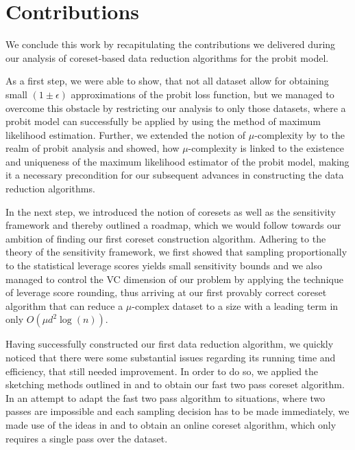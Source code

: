 \section{Contributions}

We conclude this work by recapitulating the contributions we delivered
during our analysis of coreset-based data reduction algorithms
for the probit model.

As a first step, we were able to show, that not all dataset allow
for obtaining small $(1 \pm \epsilon)$ approximations of the
probit loss function, but we
managed to overcome this obstacle by restricting our analysis to only
those datasets, where a probit model can successfully be applied
by using the method of maximum likelihood estimation.
Further, we extended the notion of $\mu$-complexity by
\cite{on-coresets} to the realm of probit analysis and showed, how
$\mu$-complexity is linked to the existence and uniqueness of the
maximum likelihood estimator of the probit model, making it a
necessary precondition for our subsequent advances in constructing the
data reduction algorithms.

In the next step, we introduced the notion of coresets as well as
the sensitivity framework and thereby outlined a roadmap, which we
would follow towards our ambition of finding our first coreset
construction algorithm.
Adhering to the theory of the sensitivity framework, we first
showed that sampling proportionally to the statistical leverage
scores yields small sensitivity bounds and we also managed to
control the VC dimension of our problem
by applying the technique of leverage
score rounding, thus arriving at our first provably correct
coreset algorithm that can reduce a $\mu$-complex dataset to
a size with a leading term in only $O(\mu d^2 \log(n))$.

Having successfully constructed our first data reduction algorithm,
we quickly noticed that there were some substantial issues regarding
its running time and efficiency,
that still needed improvement. In order to do so, we applied the sketching
methods outlined in \cite{leverage-scores-drineas} and
\cite{woodruff-2017} to obtain our fast two pass coreset algorithm.
In an attempt to adapt the fast two pass algorithm to situations,
where two passes are impossible and each sampling decision has to
be made immediately, we made use of the ideas in
\cite{online-row-sampling} and \cite{tensor-factorization}
to obtain an online coreset algorithm, which only requires a single
pass over the dataset.

